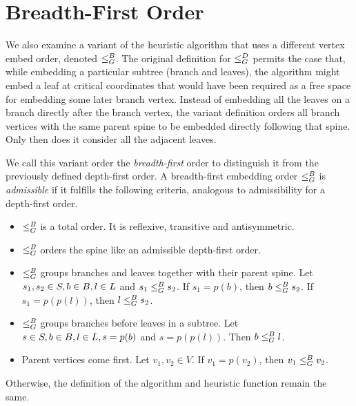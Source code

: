 \section{Breadth-First Order}
\label{section:ch5-bfs}

We also examine a variant of the heuristic algorithm that uses a different vertex embed order, denoted $\leq_G^B$.
The original definition for $\leq_G^D$ permits the case that, while embedding a particular subtree (branch and leaves), the algorithm might embed a leaf at critical coordinates that would have been required as a free space for embedding some later branch vertex. Instead of embedding all the leaves on a branch directly after the branch vertex, the variant definition orders all branch vertices with the same parent spine to be embedded directly following that spine. Only then does it consider all the adjacent leaves.

We call this variant order the \emph{breadth-first} order to distinguish it from the previously defined depth-first order.
A breadth-first embedding order $\leq_G^B$ is \emph{admissible} if it fulfills the following criteria, analogous to admissibility for a depth-first order.

\begin{itemize}
    \item $\leq_G^B$ is a total order. It is reflexive, transitive and antisymmetric.
    \item $\leq_G^B$ orders the spine like an admissible depth-first order.
    \item $\leq_G^B$ groups branches and leaves together with their parent spine. 
     Let $s_1, s_2 \in S, b \in B, l \in L$ and $s_1 \leq_G^B s_2$. If $s_1 = p(b)$, then $b \leq_G^B s_2$. If $s_1 = p(p(l))$, then $l \leq_G^B s_2$.
    \item $\leq_G^B$ groups branches before leaves in a subtree. Let $s \in S, b \in B, l \in L, s = p(b)$ and $s = p(p(l))$. Then $b \leq_G^B l$.
    \item Parent vertices come first. Let $v_1, v_2 \in V$. If $v_1 = p(v_2)$, then $v_1 \leq_G^B v_2$.
\end{itemize}

Otherwise, the definition of the algorithm and heuristic function remain the same.
